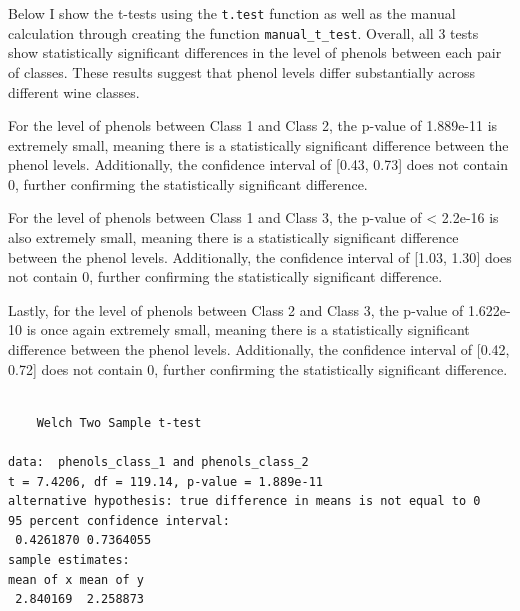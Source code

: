 \documentclass[
  letterpaper,
  DIV=11,
  numbers=noendperiod]{scrartcl}
\newenvironment{Shaded}{\begin{snugshade}}{\end{snugshade}}
\newcommand{\CommentTok}[1]{\textcolor[rgb]{0.37,0.37,0.37}{#1}}
\newcommand{\FunctionTok}[1]{\textcolor[rgb]{0.28,0.35,0.67}{#1}}
\newcommand{\NormalTok}[1]{\textcolor[rgb]{0.00,0.23,0.31}{#1}}
\newcommand{\OtherTok}[1]{\textcolor[rgb]{0.00,0.23,0.31}{#1}}
\newcommand{\SpecialCharTok}[1]{\textcolor[rgb]{0.37,0.37,0.37}{#1}}
\begin{document}
Below I show the t-tests using the \texttt{t.test} function as well as
the manual calculation through creating the function
\texttt{manual\_t\_test}. Overall, all 3 tests show statistically
significant differences in the level of phenols between each pair of
classes. These results suggest that phenol levels differ substantially
across different wine classes.

For the level of phenols between Class 1 and Class 2, the p-value of
1.889e-11 is extremely small, meaning there is a statistically
significant difference between the phenol levels. Additionally, the
confidence interval of {[}0.43, 0.73{]} does not contain 0, further
confirming the statistically significant difference.

For the level of phenols between Class 1 and Class 3, the p-value of
\textless{} 2.2e-16 is also extremely small, meaning there is a
statistically significant difference between the phenol levels.
Additionally, the confidence interval of {[}1.03, 1.30{]} does not
contain 0, further confirming the statistically significant difference.

Lastly, for the level of phenols between Class 2 and Class 3, the
p-value of 1.622e-10 is once again extremely small, meaning there is a
statistically significant difference between the phenol levels.
Additionally, the confidence interval of {[}0.42, 0.72{]} does not
contain 0, further confirming the statistically significant difference.

\begin{Shaded}
\end{Shaded}

\begin{verbatim}

    Welch Two Sample t-test

data:  phenols_class_1 and phenols_class_2
t = 7.4206, df = 119.14, p-value = 1.889e-11
alternative hypothesis: true difference in means is not equal to 0
95 percent confidence interval:
 0.4261870 0.7364055
sample estimates:
mean of x mean of y 
 2.840169  2.258873 
\end{verbatim}
\end{document}
